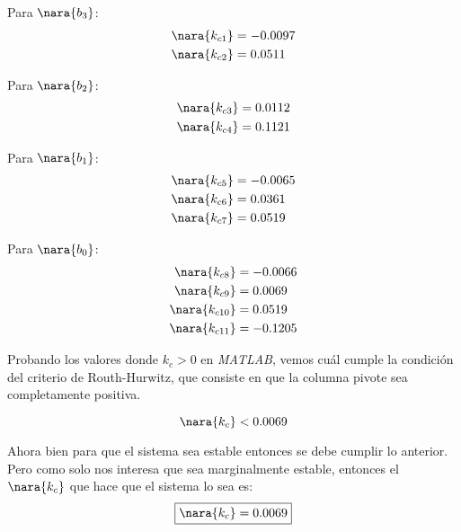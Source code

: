     \begin{multicols}{4}
        Para $\nara{b_3}$: 
        \begin{align}
            \nara{k_{c1}} & = -0.0097 \\
            \nara{k_{c2}} & = 0.0511
        \end{align}
        
        \columnbreak
        
        Para $\nara{b_2}$:
        \begin{align}
            \nara{k_{c3}} & = 0.0112 \\
            \nara{k_{c4}} & = 0.1121 \\
        \end{align}

        \columnbreak

        Para $\nara{b_1}$: 
        \begin{align}
            \nara{k_{c5}} & = -0.0065 \\
            \nara{k_{c6}} & = 0.0361 \\
            \nara{k_{c7}} & =   0.0519
        \end{align}
          
        \columnbreak

        Para $\nara{b_0}$: 
        \begin{align}
            \nara{k_{c8}} & = -0.0066 \\
            \nara{k_{c9}} & = 0.0069 \\
            \nara{k_{c10}} & = 0.0519 \\
            \nara{k_{c11}} & = -0.1205
        \end{align}
    
    \end{multicols}

Probando los valores donde \( k_c > 0 \) en \textit{MATLAB}, vemos cuál cumple la condición del criterio de Routh-Hurwitz, que consiste en que la columna pivote sea completamente positiva.

\begin{equation}
    \nara{k_{c}}  < 0.0069
\end{equation}

Ahora bien para que el sistema sea estable entonces se debe cumplir lo anterior. Pero 
como solo nos interesa que sea marginalmente estable, entonces el $\nara{k_{c}}$
que hace que el sistema lo sea es:
\begin{equation}
    \boxed{\nara{k_c} = 0.0069}
\end{equation}

